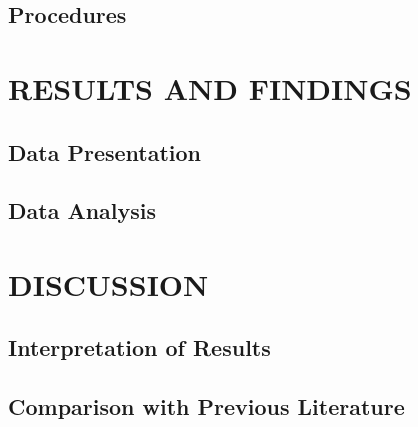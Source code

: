 \section{Procedures}


\chapter{RESULTS AND FINDINGS}

\section{Data Presentation}

\section{Data Analysis}


\chapter{DISCUSSION}

\section{Interpretation of Results}

\section{Comparison with Previous Literature}


